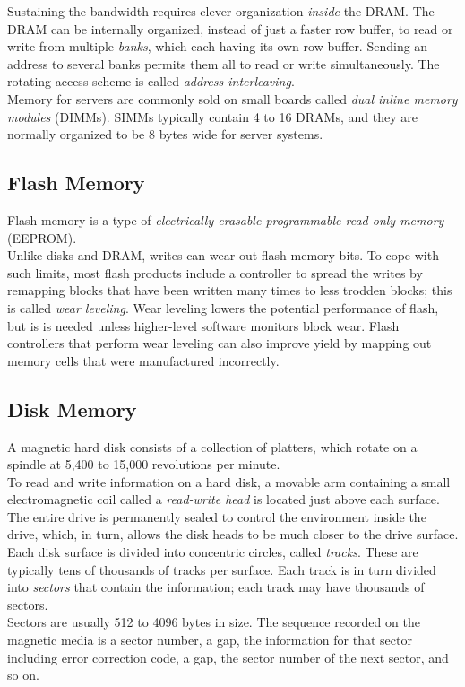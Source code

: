 \documentclass[12pt]{article}
\theoremstyle{definition}
\begin{document}
  Sustaining the bandwidth requires clever organization \emph{inside} the DRAM.
  The DRAM can be internally organized, instead of just a faster row buffer, to read or write from multiple \emph{banks}, which each having its own row buffer.
  Sending an address to several banks permits them all to read or write simultaneously.
  The rotating access scheme is called \emph{address interleaving}. \\

  Memory for servers are commonly sold on small boards called \emph{dual inline memory modules} (DIMMs).
  SIMMs typically contain 4 to 16 DRAMs, and they are normally organized to be 8 bytes wide for server systems.

  \subsection{Flash Memory}
  Flash memory is a type of \emph{electrically erasable programmable read-only memory} (EEPROM). \\
  Unlike disks and DRAM, writes can wear out flash memory bits.
  To cope with such limits, most flash products include a controller to spread the writes by remapping blocks that have been written many times to less trodden blocks;
  this is called \emph{wear leveling}.
  Wear leveling lowers the potential performance of flash, but is is needed unless higher-level software monitors block wear.
  Flash controllers that perform wear leveling can also improve yield by mapping out memory cells that were manufactured incorrectly.

  \subsection{Disk Memory}
  A magnetic hard disk consists of a collection of platters, which rotate on a spindle at 5,400 to 15,000 revolutions per minute. \\
  To read and write information on a hard disk, a movable arm containing a small electromagnetic coil called a \emph{read-write head} is located just above each surface.
  The entire drive is permanently sealed to control the environment inside the drive, which, in turn, allows the disk heads to be much closer to the drive surface. \\

  Each disk surface is divided into concentric circles, called \emph{tracks}.
  These are typically tens of thousands of tracks per surface.
  Each track is in turn divided into \emph{sectors} that contain the information; each track may have thousands of sectors. \\
  Sectors are usually 512 to 4096 bytes in size.
  The sequence recorded on the magnetic media is a sector number, a gap, the information for that sector including error correction code, a gap, the sector number of the next sector, and so on. \\
\end{document}
